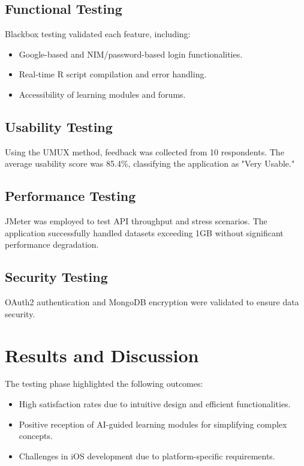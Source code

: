 \documentclass[conference,a4paper]{IEEEtran}
\begin{document}
\subsection{Functional Testing}
Blackbox testing validated each feature, including:
\begin{itemize}
  \item Google-based and NIM/password-based login functionalities.
  \item Real-time R script compilation and error handling.
  \item Accessibility of learning modules and forums.
\end{itemize}

\subsection{Usability Testing}
Using the UMUX method, feedback was collected from 10 respondents. The average
usability score was 85.4\%, classifying the application as "Very Usable."

\subsection{Performance Testing}
JMeter was employed to test API throughput and stress scenarios. The
application successfully handled datasets exceeding 1GB without significant
performance degradation.

\subsection{Security Testing}
OAuth2 authentication and MongoDB encryption were validated to ensure data
security.

\section{Results and Discussion}
\label{sect:results_discussion}

The testing phase highlighted the following outcomes:
\begin{itemize}
  \item High satisfaction rates due to intuitive design and efficient functionalities.
  \item Positive reception of AI-guided learning modules for simplifying complex
        concepts.
  \item Challenges in iOS development due to platform-specific requirements.
\end{itemize}
\end{document}
